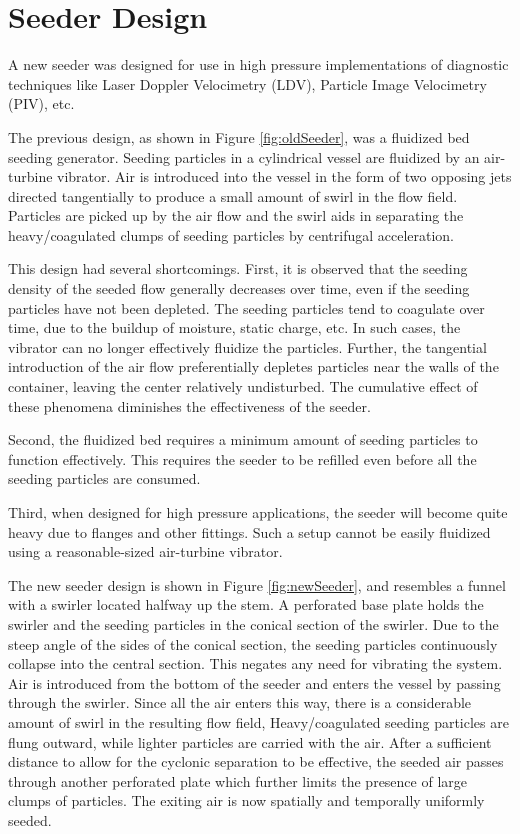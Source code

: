 \chapter{Seeder Design}
\label{app:seeder}

A new seeder was designed for use in high pressure implementations of diagnostic techniques like Laser Doppler Velocimetry (LDV), Particle Image Velocimetry (PIV), etc.



The previous design, as shown in Figure \ref{fig:oldSeeder}, was a fluidized bed seeding generator.
Seeding particles in a cylindrical vessel are fluidized by an air-turbine vibrator.
Air is introduced into the vessel in the form of two opposing jets directed tangentially to produce a small amount of swirl in the flow field.
Particles are picked up by the air flow and the swirl aids in separating the heavy/coagulated clumps of seeding particles by centrifugal acceleration.

This design had several shortcomings.
First, it is observed that the seeding density of the seeded flow generally decreases over time, even if the seeding particles have not been depleted.
The seeding particles tend to coagulate over time, due to the buildup of moisture, static charge, etc.
In such cases, the vibrator can no longer effectively fluidize the particles.
Further, the tangential introduction of the air flow preferentially depletes particles near the walls of the container, leaving the center relatively undisturbed.
The cumulative effect of these phenomena diminishes the effectiveness of the seeder.

Second, the fluidized bed requires a minimum amount of seeding particles to function effectively.
This requires the seeder to be refilled even before all the seeding particles are consumed.

Third, when designed for high pressure applications, the seeder will become quite heavy due to flanges and other fittings.
Such a setup cannot be easily fluidized using a reasonable-sized air-turbine vibrator.



The new seeder design is shown in Figure \ref{fig:newSeeder}, and resembles a funnel with a swirler located halfway up the stem.
A perforated base plate holds the swirler and the seeding particles in the conical section of the swirler.
Due to the steep angle of the sides of the conical section, the seeding particles continuously collapse into the central section.
This negates any need for vibrating the system.
Air is introduced from the bottom of the seeder and enters the vessel by passing through the swirler.
Since all the air enters this way, there is a considerable amount of swirl in the resulting flow field,
Heavy/coagulated seeding particles are flung outward, while lighter particles are carried with the air.
After a sufficient distance to allow for the cyclonic separation to be effective, the seeded air passes through another perforated plate which further limits the presence of large clumps of particles.
The exiting air is now spatially and temporally uniformly seeded.

